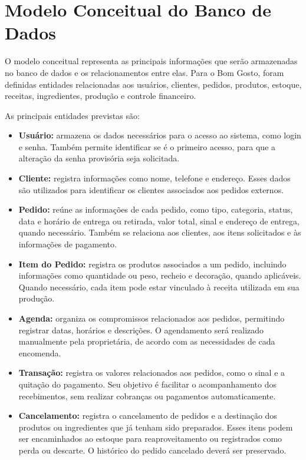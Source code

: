 \section{Modelo Conceitual do Banco de Dados}

O modelo conceitual representa as principais informações que serão armazenadas no banco de dados e os relacionamentos entre elas. Para o Bom Gosto, foram definidas entidades relacionadas aos usuários, clientes, pedidos, produtos, estoque, receitas, ingredientes, produção e controle financeiro.

As principais entidades previstas são:

\begin{itemize}
    \item \textbf{Usuário:} armazena os dados necessários para o acesso ao sistema, como login e senha. Também permite identificar se é o primeiro acesso, para que a alteração da senha provisória seja solicitada.

    \item \textbf{Cliente:} registra informações como nome, telefone e endereço. Esses dados são utilizados para identificar os clientes associados aos pedidos externos.

    \item \textbf{Pedido:} reúne as informações de cada pedido, como tipo, categoria, status, data e horário de entrega ou retirada, valor total, sinal e endereço de entrega, quando necessário. Também se relaciona aos clientes, aos itens solicitados e às informações de pagamento.

    \item \textbf{Item do Pedido:} registra os produtos associados a um pedido, incluindo informações como quantidade ou peso, recheio e decoração, quando aplicáveis. Quando necessário, cada item pode estar vinculado à receita utilizada em sua produção.

    \item \textbf{Agenda:} organiza os compromissos relacionados aos pedidos, permitindo registrar datas, horários e descrições. O agendamento será realizado manualmente pela proprietária, de acordo com as necessidades de cada encomenda.

    \item \textbf{Transação:} registra os valores relacionados aos pedidos, como o sinal e a quitação do pagamento. Seu objetivo é facilitar o acompanhamento dos recebimentos, sem realizar cobranças ou pagamentos automaticamente.

    \item \textbf{Cancelamento:} registra o cancelamento de pedidos e a destinação dos produtos ou ingredientes que já tenham sido preparados. Esses itens podem ser encaminhados ao estoque para reaproveitamento ou registrados como perda ou descarte. O histórico do pedido cancelado deverá ser preservado.


\end{itemize}
